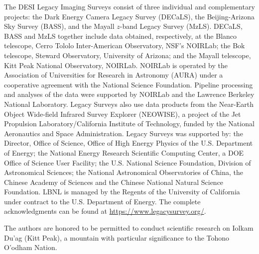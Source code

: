 \documentclass[twocolumn]{aastex631}
\begin{document}
\begin{acknowledgments}
The DESI Legacy Imaging Surveys consist of three individual and complementary projects: the Dark Energy Camera Legacy Survey (DECaLS), the Beijing-Arizona Sky Survey (BASS), and the Mayall $z$-band Legacy Survey (MzLS). DECaLS, BASS and MzLS together include data obtained, respectively, at the Blanco telescope, Cerro Tololo Inter-American Observatory, NSF’s NOIRLab; the Bok telescope, Steward Observatory, University of Arizona; and the Mayall telescope, Kitt Peak National Observatory, NOIRLab. NOIRLab is operated by the Association of Universities for Research in Astronomy (AURA) under a cooperative agreement with the National Science Foundation. Pipeline processing and analyses of the data were supported by NOIRLab and the Lawrence Berkeley National Laboratory. Legacy Surveys also use data products from the Near-Earth Object Wide-field Infrared Survey Explorer (NEOWISE), a project of the Jet Propulsion Laboratory/California Institute of Technology, funded by the National Aeronautics and Space Administration. Legacy Surveys was supported by: the Director, Office of Science, Office of High Energy Physics of the U.S. Department of Energy; the National Energy Research Scientific Computing Center, a DOE Office of Science User Facility; the U.S. National Science Foundation, Division of Astronomical Sciences; the National Astronomical Observatories of China, the Chinese Academy of Sciences and the Chinese National Natural Science Foundation. LBNL is managed by the Regents of the University of California under contract to the U.S. Department of Energy. The complete acknowledgments can be found at \url{https://www.legacysurvey.org/}.

The authors are honored to be permitted to conduct scientific research on Iolkam Du’ag (Kitt Peak), a mountain with particular significance to the Tohono O’odham Nation.

\end{acknowledgments}

%

\end{document}
